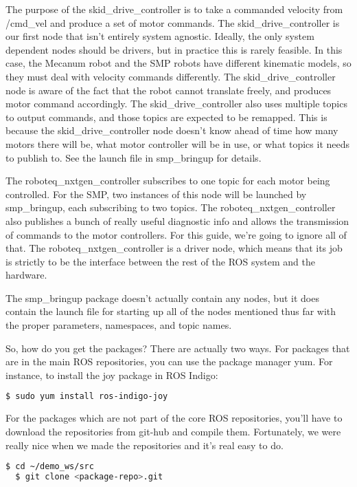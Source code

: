 The purpose of the skid\_drive\_controller is to take a commanded velocity from /cmd\_vel and produce a set of motor commands. The skid\_drive\_controller is our first node that isn't entirely system agnostic. Ideally, the only system dependent nodes should be drivers, but in practice this is rarely feasible. In this case, the Mecanum robot and the SMP robots have different kinematic models, so they must deal with velocity commands differently. The skid\_drive\_controller node is aware of the fact that the robot cannot translate freely, and produces motor command accordingly. The skid\_drive\_controller also uses multiple topics to output commands, and those topics are expected to be remapped. This is because the skid\_drive\_controller node doesn't know ahead of time how many motors there will be, what motor controller will be in use, or what topics it needs to publish to. See the launch file in smp\_bringup for details.

The roboteq\_nxtgen\_controller subscribes to one topic for each motor being controlled. For the SMP, two instances of this node will be launched by smp\_bringup, each subscribing to two topics. The roboteq\_nxtgen\_controller also publishes a bunch of really useful diagnostic info and allows the transmission of commands to the motor controllers. For this guide, we're going to ignore all of that. The roboteq\_nxtgen\_controller is a driver node, which means that its job is strictly to be the interface between the rest of the ROS system and the hardware.

The smp\_bringup package doesn't actually contain any nodes, but it does contain the launch file for starting up all of the nodes mentioned thus far with the proper parameters, namespaces, and topic names.

So, how do you get the packages? There are actually two ways. For packages that are in the main ROS repositories, you can use the package manager yum. For instance, to install the joy package in ROS Indigo:

\begin{lstlisting}[language=bash]
  $ sudo yum install ros-indigo-joy
\end{lstlisting}

For the packages which are not part of the core ROS repositories, you'll have to download the repositories from git-hub and compile them. Fortunately, we were really nice when we made the repositories and it's real easy to do.

\begin{lstlisting}[language=bash]
  $ cd ~/demo_ws/src
  $ git clone <package-repo>.git
\end{lstlisting}

